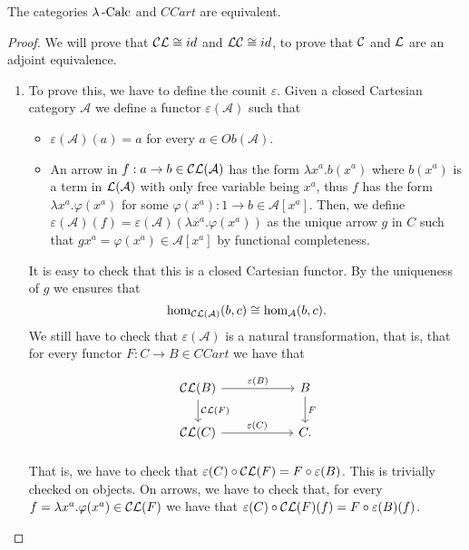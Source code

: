 \begin{definition}
\begin{theorem}The categories $\lambda\operatorname{-Calc}$ and $CCart$ are equivalent. \end{theorem}
\begin{proof}
  We will prove that $\mathcal{C} \mathcal{L} \cong id$ and  $ \mathcal{L}\mathcal{C} \cong id$, to prove that $\mathcal{C}$ and $\mathcal{L}$ are an adjoint equivalence.

  \begin{enumerate}
  \item[\fbox{$\CC \LL \cong 1_{\mathcal A}$}] To prove this, we have to define the counit $\varepsilon$. Given a closed Cartesian category $\mathcal A$ we define a functor  $\varepsilon(\mathcal A)$ such that
\begin{itemize}
\item $\varepsilon(\mathcal A)    (a) = a$ for every $a\in Ob(\mathcal A)$.
\item An arrow in $f:a\to b \in \mathcal{C} \mathcal{L}(\mathcal A)$ has the form $\lambda x^a. b(x^a)$ where $b(x^a)$ is a term in $\mathcal{L} (\mathcal A)$ with only free variable being $x^a$, thus $f$ has the form $\lambda x^a. \varphi(x^a)$ for some $\varphi(x^a): 1 \to b \in \mathcal A [x^a]$. Then, we define $\varepsilon(\mathcal A)(f) = \varepsilon(\mathcal A)(\lambda x^a.\varphi(x^a))$ as the unique arrow $g$ in $C$ such that $gx^a = \varphi(x^a) \in \mathcal A[x^a]$ by functional completeness.
\end{itemize}
It is easy to check that this is a closed Cartesian functor.  By the uniqueness of $g$ we ensures that $$\operatorname{hom}_{\mathcal{C}\mathcal{L}(\mathcal A)} (b,c)\cong \operatorname{hom}_{\mathcal A} (b,c).$$
We still have to check that $\varepsilon (\mathcal A)$ is a natural transformation, that is, that for every functor $F: C\to B\in CCart$ we have that
\[
  \begin{tikzpicture}
    \node {\begin{tikzcd}[column sep=20mm]
        \CC\LL(B)\ar[r,"\varepsilon(B)"]\ar[d,"\CC\LL(F)"] & B\ar[d,"F"]\\
        \CC\LL(C)\ar[r,"\varepsilon(C)"] & C.
    \end{tikzcd}};
\end{tikzpicture}
\]

That is, we have to check that $\varepsilon(C)\circ \mathcal{C}\mathcal{L}(F) = F \circ \varepsilon(B)$. This is trivially checked on objects. On arrows, we have to check that, for every $f = \lambda x^a.\varphi(x^a) \in \mathcal{C}\mathcal{L}(F) $ we have that $\varepsilon(C)\circ \mathcal{C}\mathcal{L}(F) (f)= F \circ \varepsilon(B)(f)$.


\end{enumerate}
\end{proof}
\end{definition}
